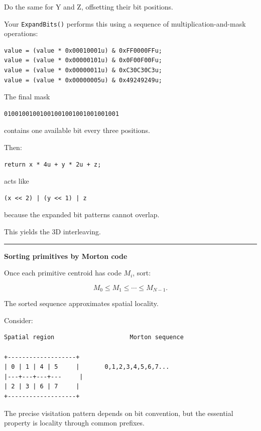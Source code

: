 Do the same for Y and Z, offsetting their bit positions.

Your \texttt{ExpandBits()} performs this using a sequence of multiplication-and-mask operations:

\begin{verbatim}
value = (value * 0x00010001u) & 0xFF0000FFu;
value = (value * 0x00000101u) & 0x0F00F00Fu;
value = (value * 0x00000011u) & 0xC30C30C3u;
value = (value * 0x00000005u) & 0x49249249u;
\end{verbatim}

The final mask

\begin{verbatim}
01001001001001001001001001001001
\end{verbatim}

contains one available bit every three positions.

Then:

\begin{verbatim}
return x * 4u + y * 2u + z;
\end{verbatim}

acts like

\begin{verbatim}
(x << 2) | (y << 1) | z
\end{verbatim}

because the expanded bit patterns cannot overlap.

This yields the 3D interleaving.

\begin{center}\rule{0.5\linewidth}{0.5pt}\end{center}

\textbf{Sorting primitives by Morton code}

Once each primitive centroid has code \(M_i\), sort:

\[
M_0\le M_1\le\cdots\le M_{N-1}.
\]

The sorted sequence approximates spatial locality.

Consider:

\begin{verbatim}
Spatial region                     Morton sequence

+-------------------+
| 0 | 1 | 4 | 5     |       0,1,2,3,4,5,6,7...
|---+---+---+---     |
| 2 | 3 | 6 | 7     |
+-------------------+
\end{verbatim}

The precise visitation pattern depends on bit convention, but the essential property is locality through common prefixes.

